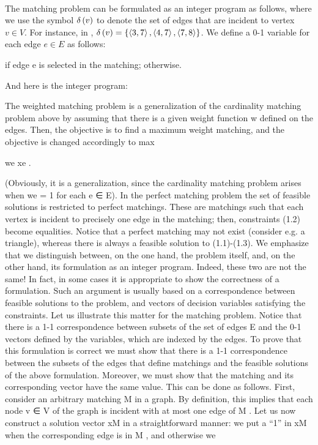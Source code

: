 \documentclass[titlepage]{book}
\begin{document}
\paragraph{}
The matching problem can be formulated as an integer program as follows, where we use the symbol $\delta\left( v \right)$ to denote the set of edges that are incident to vertex $v\in V$. For instance, in , $\delta\left( v \right)=\left\{ \left\langle 3,7 \right\rangle,\left\langle 4,7 \right\rangle,\left\langle 7,8 \right\rangle \right\}$. We define a 0-1 variable for each edge $e\in E$ as follows:


if edge e is selected in the matching;
otherwise.

And here is the integer program:


The weighted matching problem is a generalization of the cardinality matching problem above by assuming that there is a given weight function w defined on the edges. Then, the objective is to find a
maximum weight matching, and the objective is changed accordingly to max


we xe . 

(Obviously, it is a generalization, since the cardinality matching problem arises when we = 1 for each e ∈ E). In
the perfect matching problem the set of feasible solutions is restricted to perfect matchings. These are
matchings such that each vertex is incident to precisely one edge in the matching; then, constraints (1.2)
become equalities. Notice that a perfect matching may not exist (consider e.g. a triangle), whereas there
is always a feasible solution to (1.1)-(1.3). %
We emphasize that we distinguish between, on the one hand, the problem itself, and, on the other hand,
its formulation as an integer program. Indeed, these two are not the same! In fact, in some cases
it is appropriate to show the correctness of a formulation. Such an argument is usually based on a
correspondence between feasible solutions to the problem, and vectors of decision variables satisfying the
constraints.
Let us illustrate this matter for the matching problem. Notice that there is a 1-1 correspondence between
subsets of the set of edges E and the 0-1 vectors defined by the variables, which are indexed by the edges.
To prove that this formulation is correct we must show that there is a 1-1 correspondence between the
subsets of the edges that define matchings and the feasible solutions of the above formulation. Moreover,
we must show that the matching and its corresponding vector have the same value. This can be done as
follows. First, consider an arbitrary matching M in a graph. By definition, this implies that each node
v ∈ V of the graph is incident with at most one edge of M . Let us now construct a solution vector xM in
a straightforward manner: we put a “1” in xM when the corresponding edge is in M , and otherwise we
\end{document}
